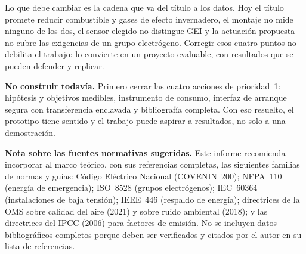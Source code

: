 \documentclass[11pt,a4paper]{article}
\begin{document}
Lo que debe cambiar es la cadena que va del título a los datos. Hoy el título promete reducir combustible y gases de efecto invernadero, el montaje no mide ninguno de los dos, el sensor elegido no distingue GEI y la actuación propuesta no cubre las exigencias de un grupo electrógeno. Corregir esos cuatro puntos no debilita el trabajo: lo convierte en un proyecto evaluable, con resultados que se pueden defender y replicar.

\begin{tcolorbox}[tarjetaDato, title={Recomendación final}]
\textbf{No construir todavía.} Primero cerrar las cuatro acciones de prioridad~1: hipótesis y objetivos medibles, instrumento de consumo, interfaz de arranque segura con transferencia enclavada y bibliografía completa. Con eso resuelto, el prototipo tiene sentido y el trabajo puede aspirar a resultados, no solo a una demostración.
\end{tcolorbox}

\vspace{6pt}

\begin{tcolorbox}[cajaContenido]
\textbf{Nota sobre las fuentes normativas sugeridas.} Este informe recomienda incorporar al marco teórico, con sus referencias completas, las siguientes familias de normas y guías: Código Eléctrico Nacional (COVENIN~200); NFPA~110 (energía de emergencia); ISO~8528 (grupos electrógenos); IEC~60364 (instalaciones de baja tensión); IEEE~446 (respaldo de energía); directrices de la OMS sobre calidad del aire (2021) y sobre ruido ambiental (2018); y las directrices del IPCC (2006) para factores de emisión. No se incluyen datos bibliográficos completos porque deben ser verificados y citados por el autor en su lista de referencias.
\end{tcolorbox}
\end{document}
